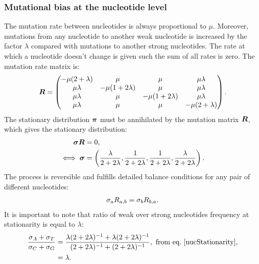 \subsubsection{Mutational bias at the nucleotide level}
\label{sec-mut-bias:mut-matrix}
The mutation rate between nucleotides is always proportional to $\mu$.
Moreover, mutations from any nucleotide to another weak nucleotide is increased by the factor $\lambda$ compared with mutations to another strong nucleotides.
The rate at which a nucleotide doesn't change is given such the sum of all rates is zero.
The mutation rate matrix is:
\begin{equation}
    \label{nucMatrix}
    \bm{R} =
    \begin{pmatrix}
    {-\mu(2 + \lambda)}
        & {\mu} & {\mu} & {\mu \lambda} \\
        {\mu \lambda} & {-\mu(1 + 2\lambda)} & {\mu} & {\mu \lambda} \\
        {\mu \lambda} & {\mu} & {-\mu(1 + 2\lambda)} & {\mu \lambda} \\
        {\mu \lambda} & {\mu} & {\mu} & {-\mu(2 + \lambda)}
    \end{pmatrix}.
\end{equation}
The stationary distribution $ \bm{\pi}$ must be annihilated by the mutation matrix $\bm{R}$, which gives the stationary distribution:
\begin{align}
    \bm{\sigma} \bm{R} & = 0, \\
    \iff \bm{\sigma} & = \left( \dfrac{\lambda}{2+2\lambda}, \dfrac{1}{2+2\lambda}, \dfrac{1}{2+2\lambda}, \dfrac{\lambda}{2+2\lambda} \right).
    \label{nucStationarity}
\end{align}
The process is reversible and fulfills detailed balance conditions for any pair of different nucleotides:
\begin{align}
    \sigma_a R_{a, b} =\sigma_b R_{b, a}.
    \label{nucMutBalance}
\end{align}
It is important to note that ratio of weak over strong nucleotides frequency at stationarity is equal to $\lambda$:
\begin{align}
    \label{lambda}
    \dfrac{ \mutequi_A + \mutequi_T }{ \mutequi_C + \mutequi_G }
    & = \dfrac{ \lambda ( 2 + 2 \lambda)^{-1} + \lambda ( 2 + 2 \lambda)^{-1}}{ ( 2 + 2 \lambda)^{-1} + ( 2 + 2 \lambda)^{-1}}, \ \textrm{from eq.~\ref{nucStationarity},}\\
    & = \lambda.
\end{align}

